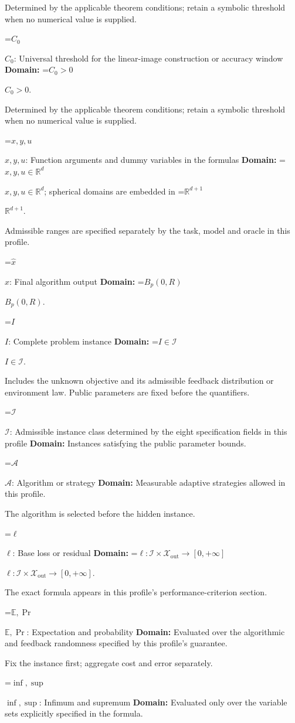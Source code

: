 \documentclass[10pt,a4paper]{article}
\newcommand{\AtlasMath}[1]{\par\begingroup\centering\setbox0=\hbox{$\displaystyle #1$}\ifdim\wd0>1.4\linewidth\typeout{ATLAS WIDE FORMULA: \the\wd0}\fi\ifdim\wd0>\linewidth\resizebox{\linewidth}{!}{\box0}\else\box0\fi\par\endgroup}
\newcommand{\AtlasInlineMath}[1]{\begingroup\setbox0=\hbox{$#1$}\ifdim\wd0>.4\linewidth\endgroup\AtlasMath{#1}\else\endgroup$#1$\fi}
\begin{document}
Determined by the applicable theorem conditions; retain a symbolic threshold when no numerical value is supplied.

\AtlasInlineMath{C_0}: Universal threshold for the linear-image construction or accuracy window \textbf{Domain:} \AtlasInlineMath{C_0>0}.

Determined by the applicable theorem conditions; retain a symbolic threshold when no numerical value is supplied.

\AtlasInlineMath{x,y,u}: Function arguments and dummy variables in the formulas \textbf{Domain:} \AtlasInlineMath{x,y,u\in\mathbb{R}^d}; spherical domains are embedded in \AtlasInlineMath{\mathbb{R}^{d+1}}.

Admissible ranges are specified separately by the task, model and oracle in this profile.

\AtlasInlineMath{\widehat{x}}: Final algorithm output \textbf{Domain:} \AtlasInlineMath{B_p(0,R)}.

\AtlasInlineMath{I}: Complete problem instance \textbf{Domain:} \AtlasInlineMath{I\in\mathcal{I}}.

Includes the unknown objective and its admissible feedback distribution or environment law. Public parameters are fixed before the quantifiers.

\AtlasInlineMath{\mathcal{I}}: Admissible instance class determined by the eight specification fields in this profile \textbf{Domain:} Instances satisfying the public parameter bounds.

\AtlasInlineMath{\mathcal{A}}: Algorithm or strategy \textbf{Domain:} Measurable adaptive strategies allowed in this profile.

The algorithm is selected before the hidden instance.

\AtlasInlineMath{\ell}: Base loss or residual \textbf{Domain:} \AtlasInlineMath{\ell:\mathcal{I}\times\mathcal{X}_{\mathrm{out}}\to[0,+\infty]}.

The exact formula appears in this profile's performance-criterion section.

\AtlasInlineMath{\mathbb{E},\Pr}: Expectation and probability \textbf{Domain:} Evaluated over the algorithmic and feedback randomness specified by this profile's guarantee.

Fix the instance first; aggregate cost and error separately.

\AtlasInlineMath{\inf,\sup}: Infimum and supremum \textbf{Domain:} Evaluated only over the variable sets explicitly specified in the formula.
\end{document}

